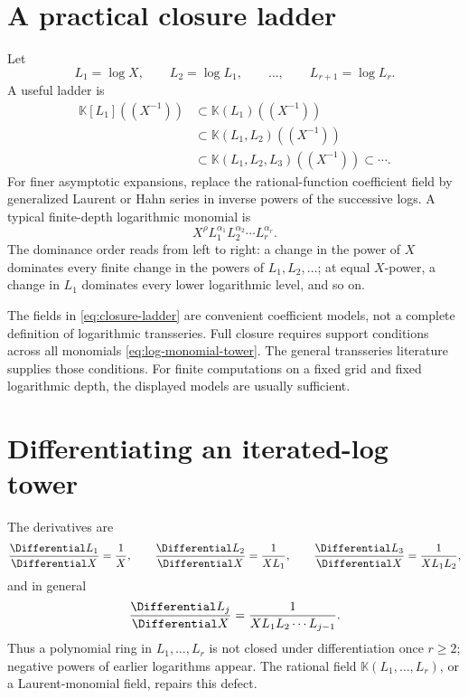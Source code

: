 \documentclass[11pt,openany]{book}
\theoremstyle{definition}
\theoremstyle{plain}
\theoremstyle{remark}
\newcommand{\K}{\mathbb{K}}
\begin{document}
\section{A practical closure ladder}
Let
\[
 L_1=\log X,
 \qquad L_2=\log L_1,
 \qquad \ldots,
 \qquad L_{r+1}=\log L_r.
\]
A useful ladder is
\begin{equation}\label{eq:closure-ladder}
\begin{split}
 \K[L_1]((X^{-1}))
 &\subset \K(L_1)((X^{-1}))\\
 &\subset \K(L_1,L_2)((X^{-1}))\\
 &\subset \K(L_1,L_2,L_3)((X^{-1}))\subset\cdots.
\end{split}
\end{equation}
For finer asymptotic expansions, replace the rational-function coefficient
field by generalized Laurent or Hahn series in inverse powers of the successive
logs.  A typical finite-depth logarithmic monomial is
\begin{equation}\label{eq:log-monomial-tower}
 X^\rho L_1^{\alpha_1}L_2^{\alpha_2}\cdots L_r^{\alpha_r}.
\end{equation}
The dominance order reads from left to right: a change in the power of \(X\)
dominates every finite change in the powers of \(L_1,L_2,\ldots\); at equal
\(X\)-power, a change in \(L_1\) dominates every lower logarithmic level, and
so on.

\begin{scopebox}
The fields in \cref{eq:closure-ladder} are convenient coefficient models, not a
complete definition of logarithmic transseries.  Full closure requires support
conditions across all monomials \eqref{eq:log-monomial-tower}.  The general
transseries literature supplies those conditions.  For finite computations on
a fixed grid and fixed logarithmic depth, the displayed models are usually
sufficient.
\end{scopebox}

\section{Differentiating an iterated-log tower}
The derivatives are
\begin{equation}\label{eq:iterated-log-derivatives}
 \frac{\Differential L_1}{\Differential X}=\frac1X,
 \qquad
 \frac{\Differential L_2}{\Differential X}=\frac1{XL_1},
 \qquad
 \frac{\Differential L_3}{\Differential X}=\frac1{XL_1L_2},
\end{equation}
and in general
\begin{equation}\label{eq:Lj-derivative}
 \frac{\Differential L_j}{\Differential X}
 =\frac1{X L_1L_2\cdots L_{j-1}}.
\end{equation}
Thus a polynomial ring in \(L_1,\ldots,L_r\) is not closed under
differentiation once \(r\ge2\); negative powers of earlier logarithms appear.
The rational field \(\K(L_1,\ldots,L_r)\), or a Laurent-monomial field, repairs
this defect.
\end{document}

